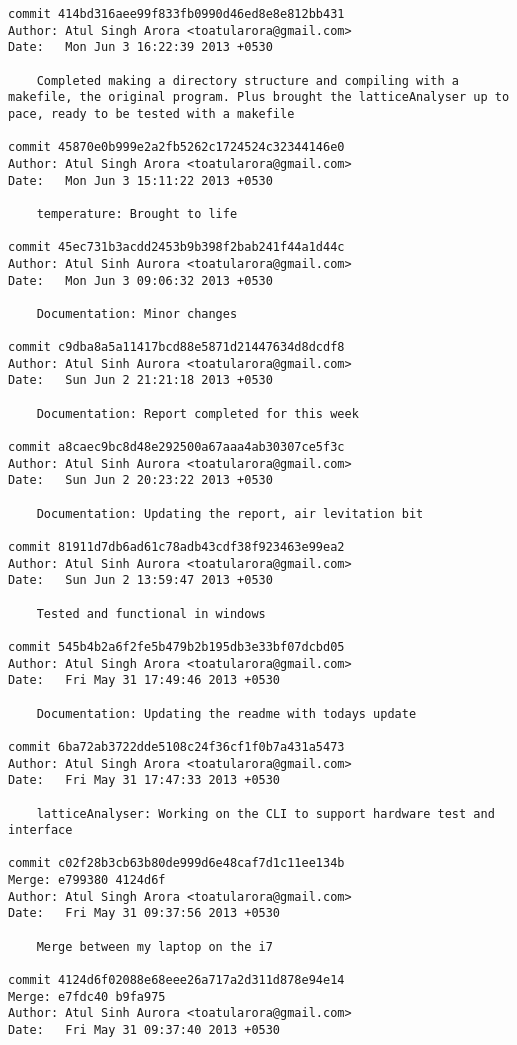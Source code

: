 \begin{lstlisting}
commit 414bd316aee99f833fb0990d46ed8e8e812bb431
Author: Atul Singh Arora <toatularora@gmail.com>
Date:   Mon Jun 3 16:22:39 2013 +0530

    Completed making a directory structure and compiling with a makefile, the original program. Plus brought the latticeAnalyser up to pace, ready to be tested with a makefile

commit 45870e0b999e2a2fb5262c1724524c32344146e0
Author: Atul Singh Arora <toatularora@gmail.com>
Date:   Mon Jun 3 15:11:22 2013 +0530

    temperature: Brought to life

commit 45ec731b3acdd2453b9b398f2bab241f44a1d44c
Author: Atul Sinh Aurora <toatularora@gmail.com>
Date:   Mon Jun 3 09:06:32 2013 +0530

    Documentation: Minor changes

commit c9dba8a5a11417bcd88e5871d21447634d8dcdf8
Author: Atul Sinh Aurora <toatularora@gmail.com>
Date:   Sun Jun 2 21:21:18 2013 +0530

    Documentation: Report completed for this week

commit a8caec9bc8d48e292500a67aaa4ab30307ce5f3c
Author: Atul Sinh Aurora <toatularora@gmail.com>
Date:   Sun Jun 2 20:23:22 2013 +0530

    Documentation: Updating the report, air levitation bit

commit 81911d7db6ad61c78adb43cdf38f923463e99ea2
Author: Atul Sinh Aurora <toatularora@gmail.com>
Date:   Sun Jun 2 13:59:47 2013 +0530

    Tested and functional in windows

commit 545b4b2a6f2fe5b479b2b195db3e33bf07dcbd05
Author: Atul Singh Arora <toatularora@gmail.com>
Date:   Fri May 31 17:49:46 2013 +0530

    Documentation: Updating the readme with todays update

commit 6ba72ab3722dde5108c24f36cf1f0b7a431a5473
Author: Atul Singh Arora <toatularora@gmail.com>
Date:   Fri May 31 17:47:33 2013 +0530

    latticeAnalyser: Working on the CLI to support hardware test and interface

commit c02f28b3cb63b80de999d6e48caf7d1c11ee134b
Merge: e799380 4124d6f
Author: Atul Singh Arora <toatularora@gmail.com>
Date:   Fri May 31 09:37:56 2013 +0530

    Merge between my laptop on the i7

commit 4124d6f02088e68eee26a717a2d311d878e94e14
Merge: e7fdc40 b9fa975
Author: Atul Sinh Aurora <toatularora@gmail.com>
Date:   Fri May 31 09:37:40 2013 +0530


\end{lstlisting}
